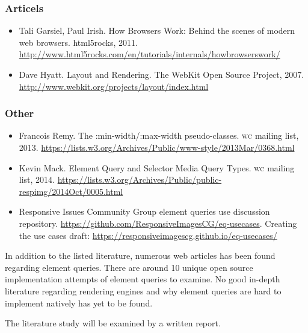 \documentclass[oneside,a4paper,11pt]{kth-mag}
\begin{document}
\subsubsection{Articels}
\begin{itemize}
\item Tali Garsiel, Paul Irish. How Browsers Work: Behind the scenes of modern web browsers. html5rocks, 2011. \url{http://www.html5rocks.com/en/tutorials/internals/howbrowserswork/}
\item Dave Hyatt. Layout and Rendering. The WebKit Open Source Project, 2007. \url{http://www.webkit.org/projects/layout/index.html}
\end{itemize}

\subsubsection{Other}
\begin{itemize}
\item Francois Remy. The :min-width/:max-width pseudo-classes. \textsc{w}\textsc{c} mailing list, 2013. \url{https://lists.w3.org/Archives/Public/www-style/2013Mar/0368.html}
\item Kevin Mack. Element Query and Selector Media Query Types. \textsc{w}\textsc{c} mailing list, 2014. \url{https://lists.w3.org/Archives/Public/public-respimg/2014Oct/0005.html}
\item Responsive Issues Community Group element queries use discussion repository. \url{https://github.com/ResponsiveImagesCG/eq-usecases}. Creating the use cases draft: \url{https://responsiveimagescg.github.io/eq-usecases/}
\end{itemize}

In addition to the listed literature, numerous web articles has been found regarding element queries. There are around 10 unique open source implementation attempts of element queries to examine. No good in-depth literature regarding rendering engines and why element queries are hard to implement natively has yet to be found.

The literature study will be examined by a written report.
\end{document}
